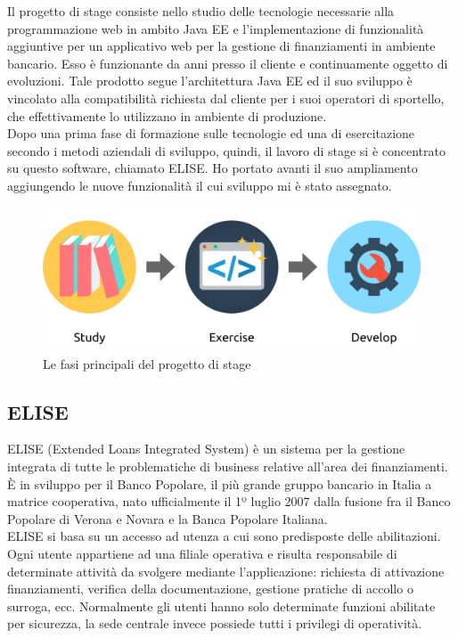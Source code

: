 Il progetto di stage consiste nello studio delle tecnologie necessarie alla programmazione web in ambito Java EE e l'implementazione di funzionalità aggiuntive per un applicativo web per la gestione di finanziamenti in ambiente bancario. Esso è funzionante da anni presso il cliente e continuamente oggetto di evoluzioni. Tale prodotto segue l'architettura Java EE ed il suo sviluppo è vincolato alla compatibilità richiesta dal cliente per i suoi operatori di sportello, che effettivamente lo utilizzano in ambiente di produzione.\\
	
Dopo una prima fase di formazione sulle tecnologie ed una di esercitazione secondo i metodi aziendali di sviluppo, quindi, il lavoro di stage si è concentrato su questo software, chiamato ELISE. Ho portato avanti il suo ampliamento aggiungendo le nuove funzionalità il cui sviluppo mi è stato assegnato.
	
	\begin{figure}[H]
		\centering
	   	\includegraphics[width=1\textwidth]{immagini/fasi_progetto}
	   	\caption{Le fasi principali del progetto di stage}
	\end{figure}

	\subsection{ELISE}
	
	ELISE (Extended Loans Integrated System) è un sistema per la gestione integrata di tutte le problematiche di business relative all'area dei finanziamenti. È in sviluppo per il Banco Popolare, il più grande gruppo bancario in Italia a matrice cooperativa, nato ufficialmente il 1º luglio 2007 dalla fusione fra il Banco Popolare di Verona e Novara e la Banca Popolare Italiana.\\
	
	ELISE si basa su un accesso ad utenza a cui sono predisposte delle abilitazioni. Ogni utente appartiene ad una filiale operativa e risulta responsabile di determinate attività da svolgere mediante l'applicazione: richiesta di attivazione finanziamenti, verifica della documentazione, gestione pratiche di accollo o surroga, ecc. Normalmente gli utenti hanno solo determinate funzioni abilitate per sicurezza, la sede centrale invece possiede tutti i privilegi di operatività.\\
	
